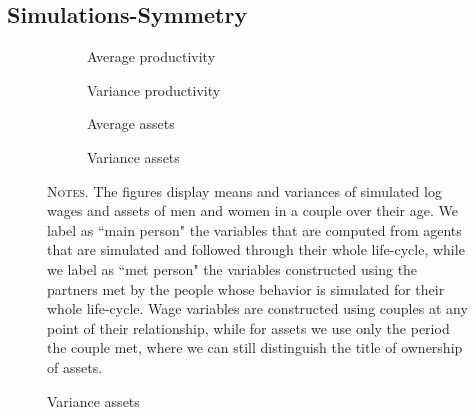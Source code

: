\documentclass[12pt]{article}
\numberwithin{table}{section}
\begin{document}
\subsection{Simulations-Symmetry}
\begin{figure}[ht]
\begin{center}
\caption{\\ Log Income and assets mean and variances by age---simulated data}
\label{fig:symmetry}

\begin{subfigure}{.49\textwidth}
\centering
\caption{Average productivity}
\label{fig:sub-firs1t}
\scalebox{0.5}{ } 
\end{subfigure}
\begin{subfigure}{.49\textwidth}
\centering
\caption{Variance productivity}
\label{fig:sub-second1}
\scalebox{0.5}{ } 
\end{subfigure}
\end{center}

\hspace{20em}

\begin{center}
\begin{subfigure}{.49\textwidth}
\centering
\caption{Average assets}
\label{fig:sub-third12}
\scalebox{0.5}{ } 
\end{subfigure}
\begin{subfigure}{.49\textwidth}
\centering
\caption{Variance assets}
\label{fig:sub-third13}
\scalebox{0.5}{ } 
\end{subfigure}
\end{center}

\begin{minipage}{0.99\textwidth} %
{\footnotesize \textsc{Notes.} The figures display means and variances of simulated log wages and assets of men and women in a couple over their age. We label as ``main person" the variables that are computed from agents that are simulated and followed through their whole life-cycle, while we label as ``met person" the variables constructed using the partners met by the people whose behavior is simulated for their whole life-cycle. Wage variables are constructed using couples at any point of their relationship, while for assets we use only the period the couple met, where we can still distinguish the title of ownership of assets. \par}
\end{minipage}
\end{figure}
\FloatBarrier
\end{document}
